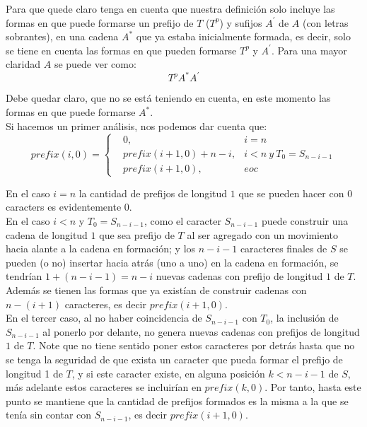 \documentclass[a4paper]{article}
\begin{document}
    Para que quede claro tenga en cuenta que nuestra definición solo incluye las formas en que puede formarse un prefijo de $T$ ($T^p$) y sufijos $A^\prime$ de $A$ (con letras sobrantes), en una cadena $A^*$ que ya estaba inicialmente formada, es decir, solo se tiene en cuenta las formas en que pueden formarse $T^p$ y $A^\prime$. Para una mayor claridad $A$ se puede ver como:
    $$T^pA^*A^\prime$$
    
    Debe quedar claro, que no se está teniendo en cuenta, en este momento las formas en que puede formarse $A^*$.\\

    Si hacemos un primer an\'alisis, nos podemos dar cuenta que:
    $$prefix(i,0) = \left\{ \begin{aligned}
        &0,& i = n \\
        & prefix(i+1,0) + n -i,& i < n~ y~ T_0=S_{n-i-1} \\
        &prefix(i+1,0), & eoc
    \end{aligned}\right.$$

    En el caso $i = n$ la cantidad de prefijos de longitud $1$ que se pueden hacer con $0$ caracters es evidentemente $0$.\\
    
    En el caso $i < n$ y $T_0=S_{n-i-1}$, como el caracter $S_{n-i-1}$ puede construir una cadena de longitud $1$ que sea prefijo de $T$ al ser agregado con un movimiento hacia alante a la cadena en formaci\'on; y 
    los $n-i-1$ caracteres finales de $S$ se pueden (o no) insertar hacia atr\'as (uno a uno) en la cadena en formaci\'on, se tendr\'ian $1 + (n-i-1) = n-i$ nuevas cadenas con prefijo de longitud $1$ de $T$.
    Adem\'as
    se tienen las formas que ya exist\'ian de construir cadenas con $n-(i+1)$ caracteres, es decir $prefix(i+1, 0)$.\\ 

    En el tercer caso, al no haber coincidencia de $S_{n-i-1}$ con $T_0$, la inclusi\'on de $S_{n-i-1}$ al ponerlo por delante, no genera nuevas cadenas con prefijos de longitud $1$ de $T$.
    Note que no tiene sentido poner estos caracteres por detr\'as hasta que no se tenga la seguridad
    de que exista un caracter que pueda formar el prefijo de longitud 1 de $T$, y si este caracter existe,
    en alguna posici\'on $k < n-i-1$ de $S$,
    m\'as adelante estos caracteres se incluir\'ian en $prefix(k, 0)$.
    Por tanto, hasta este punto se 
    mantiene que la cantidad de prefijos formados es la misma a la que se ten\'ia sin contar con $S_{n-i-1}$, es decir $prefix(i+1,0)$.\\
    
\end{document}
